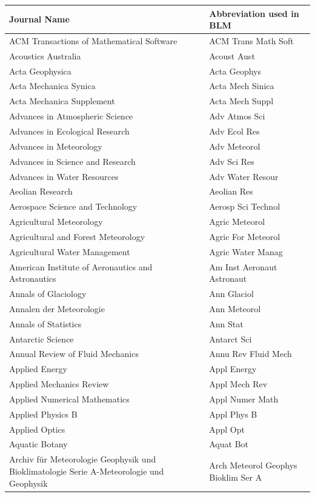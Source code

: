 \begin{longtable}{| p{8 cm} | p{6 cm} |}
\hline
Journal Name & Abbreviation used in BLM \\
\hline
ACM Transactions of Mathematical Software & ACM Trans Math Soft \\
Acoustics Australia & Acoust Aust \\
Acta Geophysica & Acta Geophys \\
Acta Mechanica Synica & Acta Mech Sinica \\
Acta Mechanica Supplement & Acta Mech Suppl \\
Advances in Atmospheric Science & Adv Atmos Sci \\
Advances in Ecological Research & Adv Ecol Res \\
Advances in Meteorology & Adv Meteorol \\
Advances in Science and Research & Adv Sci Res \\
Advances in Water Resources & Adv Water Resour \\
Aeolian Research & Aeolian Res \\
Aerospace Science and Technology & Aerosp Sci Technol \\
Agricultural Meteorology & Agric Meteorol \\
Agricultural and Forest Meteorology & Agric For Meteorol \\
Agricultural Water Management & Agric Water Manag \\
American Institute of Aeronautics and Astronautics & Am Inst Aeronaut Astronaut \\
Annals of Glaciology & Ann Glaciol \\
Annalen der Meteorologie & Ann Meteorol \\
Annals of Statistics & Ann Stat \\
Antarctic Science & Antarct Sci \\
Annual Review of Fluid Mechanics & Annu Rev Fluid Mech \\
Applied Energy & Appl Energy \\
Applied Mechanics Review & Appl Mech Rev \\
Applied Numerical Mathematics & Appl Numer Math \\
Applied Physics B & Appl Phys B \\
Applied Optics & Appl Opt \\
Aquatic Botany & Aquat Bot \\
Archiv f\"{u}r Meteorologie Geophysik und Bioklimatologie Serie A-Meteorologie und Geophysik & Arch Meteorol Geophys Bioklim Ser A \\

\end{longtable}
